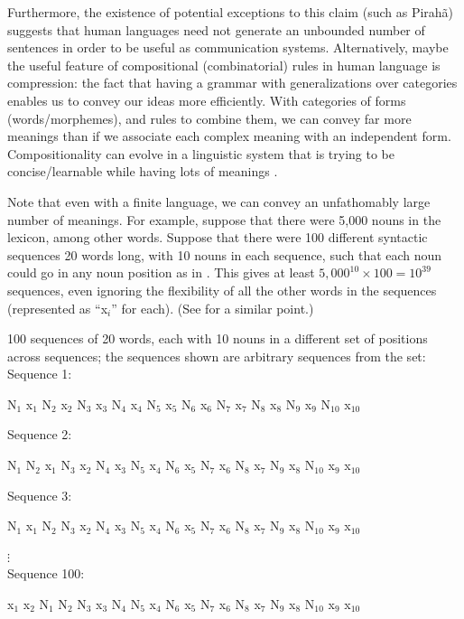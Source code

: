 \documentclass[output=paper]{langscibook}
\begin{document}
Furthermore, the existence of potential exceptions to this claim (such as Pirahã) suggests that human languages need not generate an unbounded number of sentences in order to be useful as communication systems. Alternatively, maybe the useful feature of compositional (combinatorial) rules in human language is compression: the fact that having a grammar with generalizations over categories enables us to convey our ideas more efficiently. With categories of forms (words\slash morphemes), and rules to combine them, we can convey far more meanings than if we associate each complex meaning with an independent form. Compositionality can evolve in a linguistic system that is trying to be concise/learn\-able while having lots of meanings \citep{kirby2000syntax}.


Note that even with a finite language, we can convey an unfathomably large number of meanings. For example, suppose that there were 5,000 nouns in the lexicon, among other words. Suppose that there were 100 different syntactic sequences 20 words long, with 10 nouns in each sequence, such that each noun could go in any noun position as in . This gives at least $5{,}000^{10} \times 100 = 10^{39}$ sequences, even ignoring the flexibility of all the other words in the sequences (represented as ``x$_i$'' for each). (See \citet{muller2016grammatical} for a similar point.)

\ea
\label{ex1}
100 sequences of 20 words, each with 10 nouns in a different set of positions across sequences; the sequences shown are arbitrary sequences from the set:\medskip\\
Sequence 1: \begin{center} N$_1$ x$_1$ N$_2$ x$_2$ N$_3$ x$_3$ N$_4$ x$_4$ N$_5$ x$_5$ N$_6$ x$_6$ N$_7$ x$_7$ N$_8$ x$_8$ N$_9$ x$_9$ N$_{10}$ x$_{10}$ \end{center}
Sequence 2: \begin{center} N$_1$ N$_2$ x$_1$ N$_3$ x$_2$ N$_4$ x$_3$ N$_5$ x$_4$ N$_6$ x$_5$ N$_7$ x$_6$ N$_8$ x$_7$ N$_9$ x$_8$ N$_{10}$ x$_9$ x$_{10}$ \end{center}
Sequence 3: \begin{center} N$_1$ x$_1$ N$_2$ N$_3$ x$_2$ N$_4$ x$_3$ N$_5$ x$_4$ N$_6$ x$_5$ N$_7$ x$_6$ N$_8$ x$_7$ N$_9$ x$_8$ N$_{10}$ x$_9$ x$_{10}$ \end{center}
\quad $\vdots$\\
Sequence 100: \begin{center} x$_1$ x$_2$ N$_1$ N$_2$ N$_3$ x$_3$ N$_4$ N$_5$ x$_4$ N$_6$ x$_5$ N$_7$ x$_6$ N$_8$ x$_7$ N$_9$ x$_8$ N$_{10}$ x$_9$ x$_{10}$ \end{center}
\z
\end{document}
